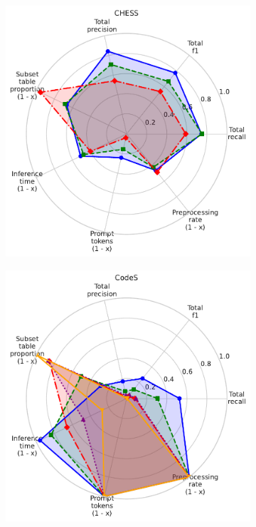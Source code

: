 \begin{figure}
  \centering
  \begin{subfigure}{0.235\linewidth}
    \centering
    \includegraphics[width=\linewidth]{figures/method_radar_charts/chess_radar.pdf}
  \end{subfigure}
  \begin{subfigure}{0.235\linewidth}
    \centering
    \includegraphics[width=\linewidth]{figures/method_radar_charts/CodeS_radar.pdf}

\end{subfigure}
\end{figure}
